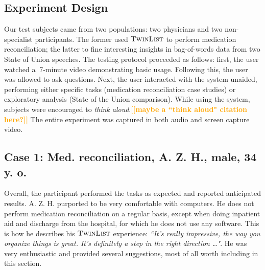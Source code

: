 \documentclass{chi2009}
\newcommand{\todo}[1]{\textsf{\textbf{\textcolor{Orange}{[[#1]]}}}}
\newcommand{\TwinList}{\textsc{TwinList}}
\begin{document}
\subsection{Experiment Design}
Our test subjects came from two populations: two physicians and two non-specialist participants. The former used $\TwinList$ to perform medication reconciliation; the latter to fine interesting insights in bag-of-words data from two State of Union speeches. The testing protocol proceeded as follows: first, the user watched a $~7$-minute video demonstrating basic usage. Following this, the user was allowed to ask questions. Next, the user interacted with the system unaided, performing either specific tasks (medication reconciliation case studies) or exploratory analysis (State of the Union comparison). While using the system, subjects were encouraged to \textit{think aloud}.\todo{maybe a ``think aloud" citation here?} The entire experiment was captured in both audio and screen capture video.

\subsection{Case 1: Med. reconciliation, A. Z. H., male, 34 y. o.}
Overall, the participant performed the tasks as expected and reported anticipated results. A. Z. H. purported to be very comfortable with computers. He does not perform medication reconciliation on a regular basis, except when doing inpatient aid and discharge from the hospital, for which he does not use any software. This is how he describes his $\TwinList$ experience: \textit{``It's really impressive, the way you organize things is great. It's definitely a step in the right direction \dots"}. He was very enthusiastic and provided several suggestions, most of all worth including in this section. 
\end{document}
